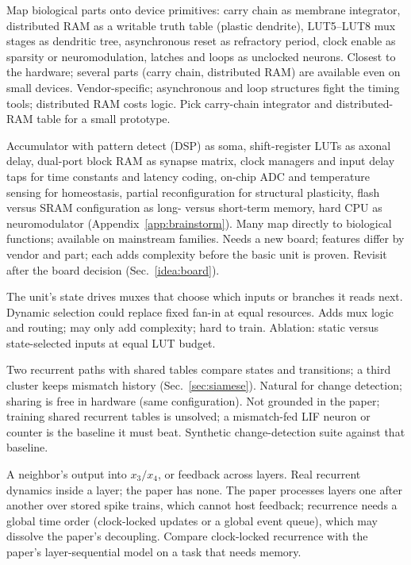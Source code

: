 {Map biological parts onto device primitives: carry chain as membrane integrator, distributed RAM as a writable truth table (plastic dendrite), LUT5--LUT8 mux stages as dendritic tree, asynchronous reset as refractory period, clock enable as sparsity or neuromodulation, latches and loops as unclocked neurons.}
{Closest to the hardware; several parts (carry chain, distributed RAM) are available even on small devices.}
{Vendor-specific; asynchronous and loop structures fight the timing tools; distributed RAM costs logic.}
{Pick carry-chain integrator and distributed-RAM table for a small prototype.}

{Accumulator with pattern detect (DSP) as soma, shift-register LUTs as axonal delay, dual-port block RAM as synapse matrix, clock managers and input delay taps for time constants and latency coding, on-chip ADC and temperature sensing for homeostasis, partial reconfiguration for structural plasticity, flash versus SRAM configuration as long- versus short-term memory, hard CPU as neuromodulator (Appendix~\ref{app:brainstorm}).}
{Many map directly to biological functions; available on mainstream families.}
{Needs a new board; features differ by vendor and part; each adds complexity before the basic unit is proven.}
{Revisit after the board decision (Sec.~\ref{idea:board}).}

{The unit's state drives muxes that choose which inputs or branches it reads next.}
{Dynamic selection could replace fixed fan-in at equal resources.}
{Adds mux logic and routing; may only add complexity; hard to train.}
{Ablation: static versus state-selected inputs at equal LUT budget.}

{Two recurrent paths with shared tables compare states and transitions; a third cluster keeps mismatch history (Sec.~\ref{sec:siamese}).}
{Natural for change detection; sharing is free in hardware (same configuration).}
{Not grounded in the paper; training shared recurrent tables is unsolved; a mismatch-fed LIF neuron or counter is the baseline it must beat.}
{Synthetic change-detection suite against that baseline.}

{A neighbor's output into $x_3/x_4$, or feedback across layers.}
{Real recurrent dynamics inside a layer; the paper has none.}
{The paper processes layers one after another over stored spike trains, which cannot host feedback; recurrence needs a global time order (clock-locked updates or a global event queue), which may dissolve the paper's decoupling.}
{Compare clock-locked recurrence with the paper's layer-sequential model on a task that needs memory.}

